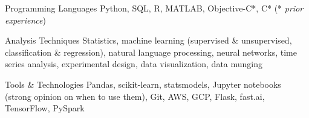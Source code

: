 
\begin{cvskills}


  \cvskill
    {Programming Languages} %
    {Python, SQL, R, MATLAB, Objective-C*, C* (* \textit{prior experience})} %


  \cvskill
    {Analysis Techniques} %
    {Statistics, machine learning (supervised \& unsupervised, classification \& regression), natural language processing, neural networks, time series analysis, experimental design, data visualization, data munging} %


  \cvskill
    {Tools \& Technologies} %
    {Pandas, scikit-learn, statsmodels, Jupyter notebooks (strong opinion on when to use them), Git, AWS, GCP, Flask, fast.ai, TensorFlow, PySpark} %


\end{cvskills}
